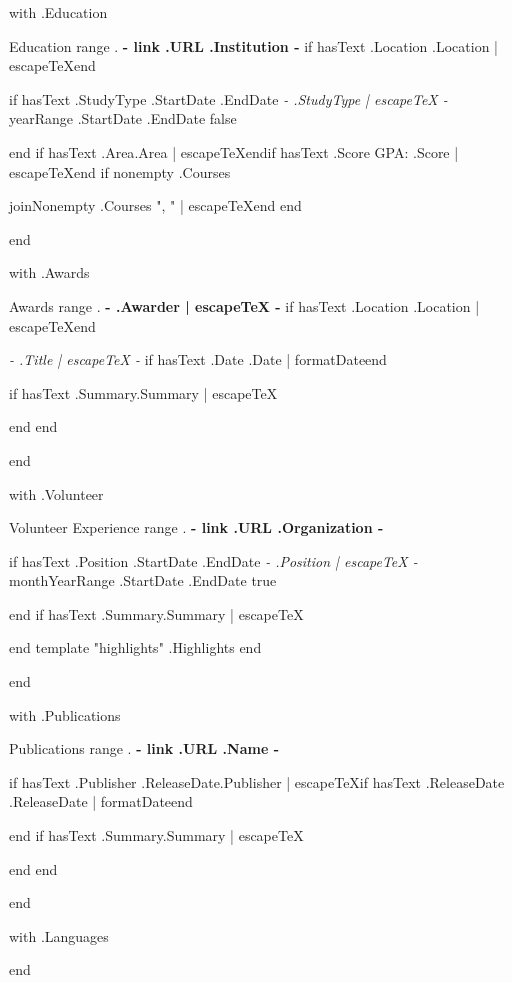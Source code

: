 {{with .Education}}
\begin{resumesection}{Education}
{{range .}}
\textbf{ {{- link .URL .Institution -}} }{{if hasText .Location}} \hfill {{.Location | escapeTeX}}{{end}}\par
{{if hasText .StudyType .StartDate .EndDate}}
\textit{ {{- .StudyType | escapeTeX -}} } \hfill {{yearRange .StartDate .EndDate false}}\par
{{end}}
{{if hasText .Area}}{{.Area | escapeTeX}}{{end}}{{if hasText .Score}} \hfill GPA: {{.Score | escapeTeX}}{{end}}
{{if nonempty .Courses}}\par {{joinNonempty .Courses ", " | escapeTeX}}{{end}}
{{end}}
\end{resumesection}
{{end}}

{{with .Awards}}
\begin{resumesection}{Awards}
{{range .}}
\textbf{ {{- .Awarder | escapeTeX -}} }{{if hasText .Location}} \hfill {{.Location | escapeTeX}}{{end}}\par
\textit{ {{- .Title | escapeTeX -}} }{{if hasText .Date}} \hfill {{.Date | formatDate}}{{end}}\par
{{if hasText .Summary}}{{.Summary | escapeTeX}}\par{{end}}
{{end}}
\end{resumesection}
{{end}}

{{with .Volunteer}}
\begin{resumesection}{Volunteer Experience}
{{range .}}
\textbf{ {{- link .URL .Organization -}} }\par
{{if hasText .Position .StartDate .EndDate}}
\textit{ {{- .Position | escapeTeX -}} } \hfill {{monthYearRange .StartDate .EndDate true}}\par
{{end}}
{{if hasText .Summary}}{{.Summary | escapeTeX}}\par{{end}}
{{template "highlights" .Highlights}}
{{end}}
\end{resumesection}
{{end}}

{{with .Publications}}
\begin{resumesection}{Publications}
{{range .}}
\textbf{ {{- link .URL .Name -}} }\par
{{if hasText .Publisher .ReleaseDate}}{{.Publisher | escapeTeX}}{{if hasText .ReleaseDate}} \hfill {{.ReleaseDate | formatDate}}{{end}}\par{{end}}
{{if hasText .Summary}}{{.Summary | escapeTeX}}\par{{end}}
{{end}}
\end{resumesection}
{{end}}

{{with .Languages}}
{{end}}


